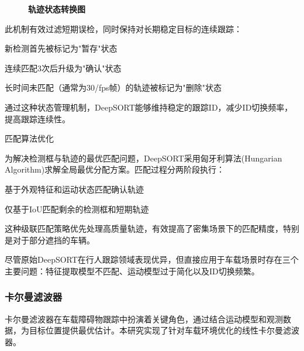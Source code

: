 \documentclass[a4paper, UTF8, fontsize=12pt]{ctexart} %
\numberwithin{equation}{section} %
\begin{document}
\begin{parlist}
\begin{figure}[H]
\caption{\textbf{轨迹状态转换图}}
\label{fig:track_lifecycle}
\end{figure}

此机制有效过滤短期误检，同时保持对长期稳定目标的连续跟踪：

\begin{circledlist}
    \item 新检测首先被标记为"暂存"状态
    \item 连续匹配3次后升级为"确认"状态
    \item 长时间未匹配（通常为30/fps帧）的轨迹被标记为"删除"状态
\end{circledlist}

通过这种状态管理机制，DeepSORT能够维持稳定的跟踪ID，减少ID切换频率，提高跟踪连续性。

\item 匹配算法优化

为解决检测框与轨迹的最优匹配问题，DeepSORT采用匈牙利算法(Hungarian Algorithm)求解全局最优分配方案。匹配过程分两阶段执行：

\begin{circledlist}
    \item 基于外观特征和运动状态匹配确认轨迹
    \item 仅基于IoU匹配剩余的检测框和短期轨迹
\end{circledlist}

这种级联匹配策略优先处理高质量轨迹，有效提高了密集场景下的匹配精度，特别是对于部分遮挡的车辆。

尽管原始DeepSORT在行人跟踪领域表现优异，但直接应用于车载场景时存在三个主要问题：特征提取模型不匹配、运动模型过于简化以及ID切换频繁。

\end{parlist}


\subsubsection{卡尔曼滤波器}

卡尔曼滤波器在车载障碍物跟踪中扮演着关键角色，通过结合运动模型和观测数据，为目标位置提供最优估计。本研究实现了针对车载环境优化的线性卡尔曼滤波器。
\end{document}
